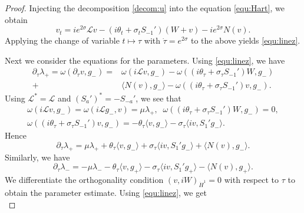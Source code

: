 \documentclass[reqno, 11pt]{amsart}
\numberwithin{equation}{section}
\theoremstyle{plain}
\theoremstyle{definition}
\numberwithin{equation}{section}
\numberwithin{theorem}{section}
\numberwithin{equation}{section}
\numberwithin{equation}{section}
\numberwithin{theorem}{section}
\begin{document}
	\begin{proof} Injecting the decomposition \eqref{decom:u} into the equation \eqref{equ:Hart}, we obtain
		\begin{equation*}
		v_t=ie^{2\sigma}\mathcal{L}v-\left(i\theta_t+\sigma_{t}S_{-1}' \right)(W+v)-ie^{2\sigma}N(v).	
		\end{equation*}
		Applying the change of variable $t\mapsto\tau$ with $\dot{\tau}=e^{2\sigma}$ to the above yields \eqref{equ:linez}.
		
		Next we consider the equations for the parameters. Using \eqref{equ:linez}, we have 
		\begin{equation*}
		\begin{aligned}
		\partial_{\tau}\lambda_+=\omega(\partial_{\tau}v,g_-)=&\omega(i\mathcal{L}v,g_-)-\omega\left( \left(i\theta_{\tau}+\sigma_{\tau}S_{-1}' \right)W ,g_-\right)\\+&\langle N(v),g_-\rangle-\omega\left( \left(i\theta_{\tau}+\sigma_{\tau}S_{-1}'\right)v ,g_-\right).
		\end{aligned}
		\end{equation*}
		Using  $\mathcal{L}^{*}=\mathcal{L}$ and $\left( S_{a}'\right)^*=-S_{-a}'$, we see that 
		\begin{equation*}
		\begin{aligned}
		\omega(i\mathcal{L}v,g_-)=\omega(i\mathcal{L}g_-,v)=\mu\lambda_+, \;\;  \omega\left( \left(i\theta_{\tau}+\sigma_{\tau}S_{-1}'\right)W ,g_-\right)=0,\\\omega\left( \left(i\theta_{\tau}+\sigma_{\tau}S_{-1}' \right)v ,g_-\right)=-\theta_{\tau}\langle v,g_-\rangle-\sigma_{\tau}\langle iv,S_{1}'g_-\rangle.
		\end{aligned}
		\end{equation*}
		Hence
		\begin{equation}\label{equ:dyn lam+}
		\partial_{\tau}\lambda_+=\mu\lambda_++\theta_{\tau}\langle v,g_-\rangle+\sigma_{\tau}\langle iv,S_{1}'g_-\rangle+\langle N(v),g_-\rangle.
		\end{equation}
		Similarly, we have
		\begin{equation}\label{equ:dyn lam-}
		\partial_{\tau}\lambda_-=-\mu\lambda_--\theta_{\tau}\langle v,g_+\rangle-\sigma_{\tau}\langle iv,S_{1}'g_+\rangle-\langle N(v),g_+\rangle.
		\end{equation}
		We differentiate the orthogonality condition $(v,iW)_{\dot H^1}=0$ with respect to $\tau$ to obtain the parameter estimate. Using \eqref{equ:linez}, we get
		\begin{equation*}

\end{equation*}
\end{proof}
\end{document}
